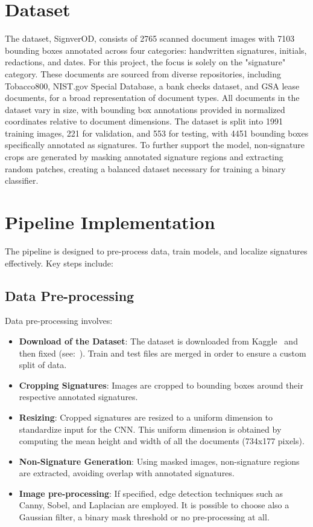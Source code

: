 \documentclass[a4paper,12pt]{article}
\begin{document}
\section{Dataset}
The dataset, SignverOD, consists of 2765 scanned document images with 7103 bounding boxes annotated across four categories: handwritten signatures, initials, redactions, and dates. For this project, the focus is solely on the "signature" category. These documents are sourced from diverse repositories, including Tobacco800, NIST.gov Special Database, a bank checks dataset, and GSA lease documents, for a broad representation of document types. All documents in the dataset vary in size, with bounding box annotations provided in normalized coordinates relative to document dimensions. The dataset is split into 1991 training images, 221 for validation, and 553 for testing, with 4451 bounding boxes specifically annotated as signatures. To further support the model, non-signature crops are generated by masking annotated signature regions and extracting random patches, creating a balanced dataset necessary for training a binary classifier.

\section{Pipeline Implementation}
The pipeline is designed to pre-process data, train models, and localize signatures effectively. Key steps include:

\subsection{Data Pre-processing}
Data pre-processing involves:
\begin{itemize}
    \item \textbf{Download of the Dataset}: The dataset is downloaded from Kaggle~\cite{dataset} and then fixed (see:~\cite{dataset_fix}). Train and test files are merged in order to ensure a custom split of data.
    \item \textbf{Cropping Signatures}: Images are cropped to bounding boxes around their respective annotated signatures.
    \item \textbf{Resizing}: Cropped signatures are resized to a uniform dimension to standardize input for the CNN. This uniform dimension is obtained by computing the mean height and width of all the documents (734x177 pixels).
    \item \textbf{Non-Signature Generation}: Using masked images, non-signature regions are extracted, avoiding overlap with annotated signatures.
    \item \textbf{Image pre-processing}: If specified, edge detection techniques such as Canny, Sobel, and Laplacian are employed. It is possible to choose also a Gaussian filter, a binary mask threshold or no pre-processing at all.
\end{itemize}
\end{document}
